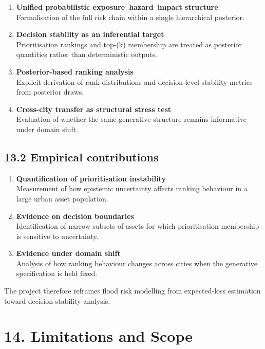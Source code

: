 \documentclass[
]{article}
\begin{document}
\begin{enumerate}
\def\labelenumi{\arabic{enumi}.}
\item
  \textbf{Unified probabilistic exposure--hazard--impact structure}\\
  Formalisation of the full risk chain within a single hierarchical
  posterior.
\item
  \textbf{Decision stability as an inferential target}\\
  Prioritisation rankings and top-(k) membership are treated as
  posterior quantities rather than deterministic outputs.
\item
  \textbf{Posterior-based ranking analysis}\\
  Explicit derivation of rank distributions and decision-level stability
  metrics from posterior draws.
\item
  \textbf{Cross-city transfer as structural stress test}\\
  Evaluation of whether the same generative structure remains
  informative under domain shift.
\end{enumerate}

\subsection{13.2 Empirical contributions}\label{empirical-contributions}

\begin{enumerate}
\def\labelenumi{\arabic{enumi}.}
\item
  \textbf{Quantification of prioritisation instability}\\
  Measurement of how epistemic uncertainty affects ranking behaviour in
  a large urban asset population.
\item
  \textbf{Evidence on decision boundaries}\\
  Identification of narrow subsets of assets for which prioritisation
  membership is sensitive to uncertainty.
\item
  \textbf{Evidence under domain shift}\\
  Analysis of how ranking behaviour changes across cities when the
  generative specification is held fixed.
\end{enumerate}

The project therefore reframes flood risk modelling from expected-loss
estimation toward decision stability analysis.

\section{14. Limitations and Scope}\label{limitations-and-scope}
\end{document}
